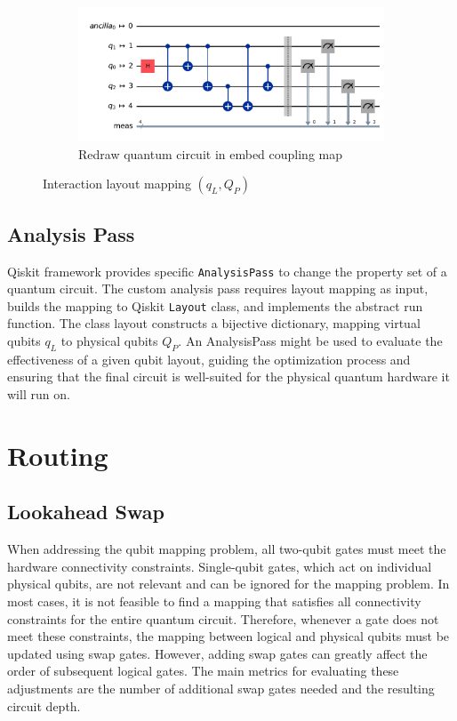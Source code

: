 \begin{figure}[htbp]
\begin{subfigure}{0.6\linewidth}
        \label{fig:plot-circuit-layout}
    \end{subfigure}
    \vspace{1em}
    \begin{subfigure}{0.6\linewidth}
        \includegraphics[width=\linewidth]{image/circuit_layout.png}
        \caption{Redraw quantum circuit in embed coupling map}
        \label{fig:circuit-layout-isa}
    \end{subfigure}
    \caption{Interaction layout mapping $(q_L, Q_P)$}
\end{figure}

\subsection{Analysis Pass} %
Qiskit framework provides specific \lstinline{AnalysisPass} \cite{ibmquantum_analysispass} to change the property set of a quantum circuit. The custom analysis pass requires layout mapping as input, builds the mapping to Qiskit \lstinline{Layout} \cite{ibmquantum_layout} class, and implements the abstract run function. The class layout constructs a bijective dictionary, mapping virtual qubits $q_L$ to physical qubits $Q_P$. An AnalysisPass might be used to evaluate the effectiveness of a given qubit layout, guiding the optimization process and ensuring that the final circuit is well-suited for the physical quantum hardware it will run on.

\newpage
\section{Routing}
\subsection{Lookahead Swap}
When addressing the qubit mapping problem, all two-qubit gates must meet the hardware connectivity constraints. Single-qubit gates, which act on individual physical qubits, are not relevant and can be ignored for the mapping problem. In most cases, it is not feasible to find a mapping that satisfies all connectivity constraints for the entire quantum circuit. Therefore, whenever a gate does not meet these constraints, the mapping between logical and physical qubits must be updated using swap gates. However, adding swap gates can greatly affect the order of subsequent logical gates. The main metrics for evaluating these adjustments are the number of additional swap gates needed and the resulting circuit depth.

